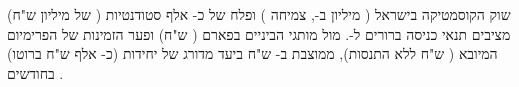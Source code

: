 \begin{keymessage}
שוק הקוסמטיקה בישראל ( מיליון ב-, צמיחה )
ופלח של כ- אלף סטודנטיות ( של  מיליון ש"ח) מציבים
תנאי כניסה ברורים ל-. מול מותגי הביניים בפארם ( ש"ח) ופער
הזמינות של הפרימיום המיובא ( ש"ח ללא התנסות),  ממוצבת
ב- ש"ח ביעד מדורג של  יחידות (כ- אלף ש"ח ברוטו)
בחודשים .
\end{keymessage}
